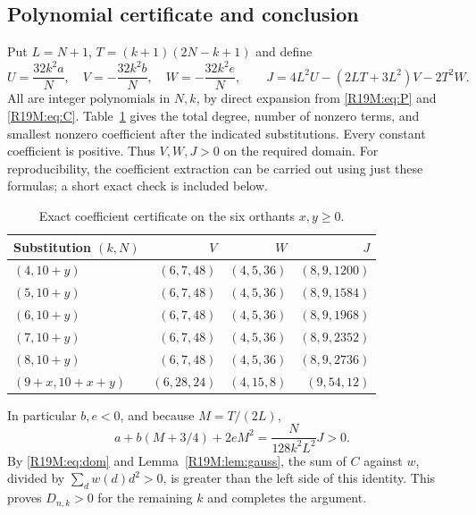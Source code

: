 \documentclass[11pt,a4paper]{article}
\begin{document}
\subsection{Polynomial certificate and conclusion}
Put $L=N+1$, $T=(k+1)(2N-k+1)$ and define
\[
 U=\frac{32k^2a}{N},\quad V=-\frac{32k^2b}{N},\quad
 W=-\frac{32k^2e}{N},\qquad
 J=4L^2U-(2LT+3L^2)V-2T^2W.
\]
All are integer polynomials in $N,k$, by direct expansion from
\eqref{R19M:eq:P} and \eqref{R19M:eq:C}. Table~\ref{R19M:tab:cert} gives
the total degree, number of nonzero terms, and smallest nonzero
coefficient after the indicated substitutions. Every constant
coefficient is positive. Thus $V,W,J>0$ on the required domain.
For reproducibility, the coefficient extraction can be carried out
using just these formulas; a short exact check is included below.

\begin{table}[ht]
\centering
\begin{tabular}{lrrr}
\toprule
Substitution $(k,N)$ & $V$ & $W$ & $J$\\
\midrule
$(4,10+y)$ & $(6,7,48)$ & $(4,5,36)$ & $(8,9,1200)$\\
$(5,10+y)$ & $(6,7,48)$ & $(4,5,36)$ & $(8,9,1584)$\\
$(6,10+y)$ & $(6,7,48)$ & $(4,5,36)$ & $(8,9,1968)$\\
$(7,10+y)$ & $(6,7,48)$ & $(4,5,36)$ & $(8,9,2352)$\\
$(8,10+y)$ & $(6,7,48)$ & $(4,5,36)$ & $(8,9,2736)$\\
$(9+x,10+x+y)$ & $(6,28,24)$ & $(4,15,8)$ & $(9,54,12)$\\
\bottomrule
\end{tabular}
\caption{Exact coefficient certificate on the six orthants $x,y\ge0$.}
\label{R19M:tab:cert}
\end{table}

In particular $b,e<0$, and because $M=T/(2L)$,
\[
 a+b(M+3/4)+2eM^2=\frac{N}{128k^2L^2}J>0.
\]
By \eqref{R19M:eq:dom} and Lemma~\ref{R19M:lem:gauss}, the sum of $C$ against $w$,
divided by $\sum_d w(d)d^2>0$, is greater than the left side of this
identity. This proves $D_{n,k}>0$ for the remaining $k$ and completes
the argument.
\end{document}
